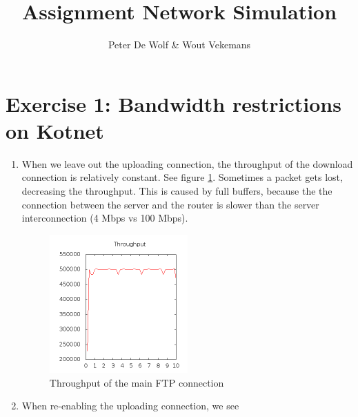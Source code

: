 \documentclass[a4paper,12pt,titlepage]{report}
\title{Assignment Network Simulation}
\author{Peter De Wolf \& Wout Vekemans}
\begin{document}
\begin{titlepage}
	\maketitle
	\thispagestyle{empty}
\end{titlepage}

\section{Exercise 1: Bandwidth restrictions on Kotnet}
\begin{enumerate}
 \item When we leave out the uploading connection, the throughput of the download connection is relatively constant. See figure \ref{noUpload}. Sometimes a packet gets lost, decreasing the throughput. This is caused by full buffers, because the the connection between the server and the router is slower than the server interconnection (4 Mbps vs 100 Mbps).
  \begin{figure}[!h]
\centering
\includegraphics[width=0.5\textwidth]{noUpload.png}
\caption{Throughput of the main FTP connection}
\label{noUpload}
\end{figure}
\item When re-enabling the uploading connection, we see 
\end{enumerate}
\end{document}
